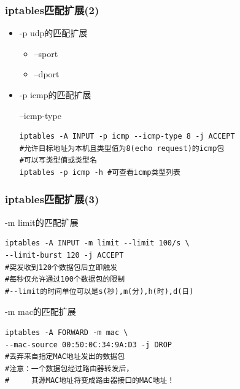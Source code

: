 \documentclass[xcolor=svgnames,presentation]{beamer}
\begin{document}
\begin{frame}[fragile]
\frametitle{iptables匹配扩展(2)}
\label{sec-2-25}
\begin{itemize}

\item -p udp的匹配扩展
\label{sec-2-25-1}%
\begin{itemize}

\item --sport
\label{sec-2-25-1-1}%

\item --dport
\label{sec-2-25-1-2}%
\end{itemize} %

\item -p icmp的匹配扩展
\label{sec-2-25-2}%
\begin{exampleblock}{--icmp-type}
\label{sec-2-25-2-1}


\begin{verbatim}
iptables -A INPUT -p icmp --icmp-type 8 -j ACCEPT
#允许目标地址为本机且类型值为8(echo request)的icmp包
#可以写类型值或类型名
iptables -p icmp -h #可查看icmp类型列表
\end{verbatim}
\end{exampleblock}
\end{itemize} %
\end{frame}
\begin{frame}[fragile]
\frametitle{iptables匹配扩展(3)}
\label{sec-2-26}
\begin{exampleblock}{-m limit的匹配扩展}
\label{sec-2-26-1}


\begin{verbatim}
iptables -A INPUT -m limit --limit 100/s \
--limit-burst 120 -j ACCEPT
#突发收到120个数据包后立即触发
#每秒仅允许通过100个数据包的限制
#--limit的时间单位可以是s(秒),m(分),h(时),d(日)
\end{verbatim}
\end{exampleblock}
\begin{block}{-m mac的匹配扩展}
\label{sec-2-26-2}


\begin{verbatim}
iptables -A FORWARD -m mac \
--mac-source 00:50:0C:34:9A:D3 -j DROP
#丢弃来自指定MAC地址发出的数据包
#注意：一个数据包经过路由器转发后，
#     其源MAC地址将变成路由器接口的MAC地址！
\end{verbatim}
\end{block}
\end{frame}
\end{document}
